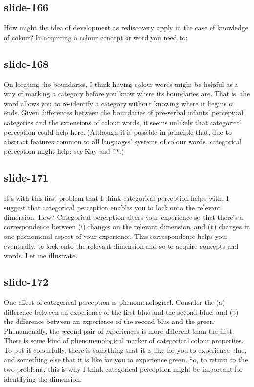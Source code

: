\documentclass[12pt,\papersize]{extarticle}
\begin{document}
 
\subsection{slide-166}
How might the idea of development as rediscovery apply in the case of knowledge of colour?
In acquiring a colour concept or word you need to:
 
 
\subsection{slide-168}
On locating the boundaries, I think having colour words might be helpful as a way of marking a category before you know where its boundaries are. That is, the word allows you to re-identify a category without knowing where it begins or ends.
Given differences between the boundaries of pre-verbal infants' perceptual categories and the extensions of colour words, it seems unlikely that categorical perception could help here. (Although it is possible in principle that, due to abstract features common to all languages' systems of colour words, categorical perception might help; see Kay and ?*.)
 
 
\subsection{slide-171}
It's with this first problem that I think categorical perception helps with. I suggest that categorical perception enables you to lock onto the relevant dimension.
How? Categorical perception alters your experience so that there's a correspondence between (i) changes on the relevant dimension, and (ii) changes in one phenomenal aspect of your experience. This correspondence helps you, eventually, to lock onto the relevant dimension and so to acquire concepts and words. Let me illustrate.
 
 
\subsection{slide-172}
One effect of categorical perception is phenomenological.
Consider the (a) difference between an experience of the first blue and the second blue;
and (b) the difference between an experience of the second blue and the green.
Phenomenally, the second pair of experiences is more different than the first.
There is some kind of phenomenological marker of categorical colour properties.
To put it colourfully, there is something that it is like for you to experience blue, and something else that it is like for you to experience green.
So, to return to the two problems, this is why I think categorical perception might be important for identifying the dimension.
 
\end{document}
